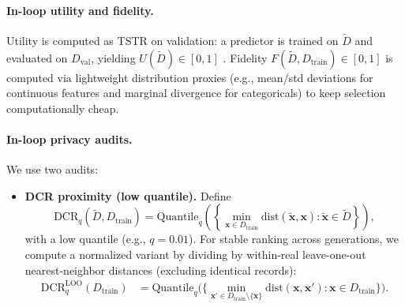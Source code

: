 \documentclass[preprint,12pt]{elsarticle}
\begin{document}
\paragraph{In-loop utility and fidelity.}
Utility is computed as TSTR on validation: a predictor is trained on $\tilde{D}$ and evaluated on $D_{\text{val}}$, yielding $U(\tilde{D})\in[0,1]$ \cite{Jia2024}. Fidelity $F(\tilde{D},D_{\text{train}})\in[0,1]$ is computed via lightweight distribution proxies (e.g., mean/std deviations for continuous features and marginal divergence for categoricals) to keep selection computationally cheap.

\paragraph{In-loop privacy audits.}
We use two audits:
\begin{itemize}
    \item \textbf{DCR proximity (low quantile).} Define
    \begin{equation}
    \mathrm{DCR}_{q}(\tilde{D},D_{\text{train}})=
    \mathrm{Quantile}_{q}\left(\left\{\min_{\mathbf{x}\in D_{\text{train}}}\mathrm{dist}(\tilde{\mathbf{x}},\mathbf{x}) : \tilde{\mathbf{x}}\in \tilde{D}\right\}\right),
    \end{equation}
    with a low quantile (e.g., $q=0.01$). For stable ranking across generations, we compute a normalized variant by dividing by within-real leave-one-out nearest-neighbor distances (excluding identical records):
   \begin{equation}
\begin{aligned}
\mathrm{DCR}_{q}^{\mathrm{LOO}}(D_{\text{train}})
&=
\mathrm{Quantile}_{q}\!\Big(
\Big\{
\min_{\mathbf{x}'\in D_{\text{train}}\setminus\{\mathbf{x}\}}
\mathrm{dist}(\mathbf{x},\mathbf{x}')
:\mathbf{x}\in D_{\text{train}}
\Big\}
\Big).
\end{aligned}
\end{equation}


\end{itemize}
\end{document}

